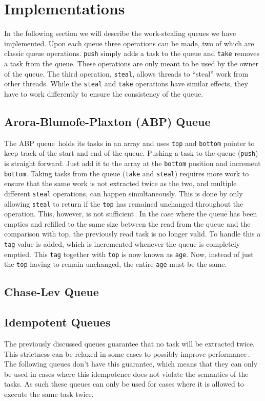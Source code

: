 \section{Implementations}
\label{sec:implementations}
In the following section we will describe the work-stealing queues we have implemented. Upon each queue three operations can be made, two of which are classic queue operations. \texttt{push} simply adds a task to the queue and \texttt{take} removes a task from the queue. These operations are only meant to be used by the owner of the queue. The third operation, \texttt{steal}, allows threads to ``steal'' work from other threads. While the \texttt{steal} and \texttt{take} operations have similar effects, they have to work differently to ensure the consistency of the queue.

\subsection{Arora-Blumofe-Plaxton (ABP) Queue}
The ABP queue\,\cite{Arora:1998:TSM:277651.277678} holds its tasks in an array and uses \texttt{top} and \texttt{bottom} pointer to keep track of the start and end of the queue. Pushing a task to the queue (\texttt{push}) is straight forward. Just add it to the array at the \texttt{bottom} position and increment \texttt{bottom}. Taking tasks from the queue (\texttt{take} and \texttt{steal}) requires more work to ensure that the same work is not extracted twice as the two, and multiple different \texttt{steal} operations, can happen simultaneously. This is done by only allowing \texttt{steal} to return if the \texttt{top} has remained unchanged throughout the operation. This, however, is not sufficient\,\cite[p. 4]{Arora:1998:TSM:277651.277678}. In the case where the queue has been empties and refilled to the same size between the read from the queue and the comparison with top, the previously read task is no longer valid. To handle this a \texttt{tag} value is added, which is incremented whenever the queue is completely emptied. This \texttt{tag} together with \texttt{top} is now known as \texttt{age}. Now, instead of just the \texttt{top} having to remain unchanged, the entire \texttt{age} must be the same.

\subsection{Chase-Lev Queue}


\subsection{Idempotent Queues}
The previously discussed queues guarantee that no task will be extracted twice. This strictness can be relaxed in some cases to possibly improve performance\,\cite[p. 46]{Michael:2009:IWS:1594835.1504186}. The following queues don't have this guarantee, which means that they can only be used in cases where this idempotence does not violate the semantics of the tasks. As such these queues can only be used for cases where it is allowed to execute the same task twice.

